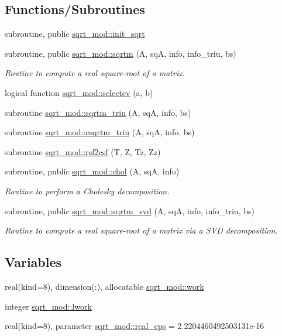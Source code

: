 \subsection*{Functions/\+Subroutines}
\begin{DoxyCompactItemize}
\item 
subroutine, public \hyperlink{namespacesqrt__mod_ab0108c0f48903dcc961e731c0ccb55d8}{sqrt\+\_\+mod\+::init\+\_\+sqrt}
\item 
subroutine, public \hyperlink{namespacesqrt__mod_a6da01b705b42190ac5b629e9267b0506}{sqrt\+\_\+mod\+::sqrtm} (A, sqA, info, info\+\_\+triu, bs)
\begin{DoxyCompactList}\small\item\em Routine to compute a real square-\/root of a matrix. \end{DoxyCompactList}\item 
logical function \hyperlink{namespacesqrt__mod_a8789d2f86087703a058918101999894f}{sqrt\+\_\+mod\+::selectev} (a, b)
\item 
subroutine \hyperlink{namespacesqrt__mod_a0bce77dc166341fedad843599efd43c7}{sqrt\+\_\+mod\+::sqrtm\+\_\+triu} (A, sqA, info, bs)
\item 
subroutine \hyperlink{namespacesqrt__mod_a7ed927e15fad09a188abebe860651125}{sqrt\+\_\+mod\+::csqrtm\+\_\+triu} (A, sqA, info, bs)
\item 
subroutine \hyperlink{namespacesqrt__mod_a322dc68a48c31785fb167134331e21e3}{sqrt\+\_\+mod\+::rsf2csf} (T, Z, Tz, Zz)
\item 
subroutine, public \hyperlink{namespacesqrt__mod_a6dd33ec6afedb4b752026bba20204f2c}{sqrt\+\_\+mod\+::chol} (A, sqA, info)
\begin{DoxyCompactList}\small\item\em Routine to perform a Cholesky decomposition. \end{DoxyCompactList}\item 
subroutine, public \hyperlink{namespacesqrt__mod_a99d44e5fd3e8203544db6a8331e38828}{sqrt\+\_\+mod\+::sqrtm\+\_\+svd} (A, sqA, info, info\+\_\+triu, bs)
\begin{DoxyCompactList}\small\item\em Routine to compute a real square-\/root of a matrix via a S\+VD decomposition. \end{DoxyCompactList}\end{DoxyCompactItemize}
\subsection*{Variables}
\begin{DoxyCompactItemize}
\item 
real(kind=8), dimension(\+:), allocatable \hyperlink{namespacesqrt__mod_aa2d42644fd62e62db048520605cd3de8}{sqrt\+\_\+mod\+::work}
\item 
integer \hyperlink{namespacesqrt__mod_a1e8a5c8ae6e96f5f02221379e30c0115}{sqrt\+\_\+mod\+::lwork}
\item 
real(kind=8), parameter \hyperlink{namespacesqrt__mod_a3e5758c92ccdba50c78201262be093c7}{sqrt\+\_\+mod\+::real\+\_\+eps} = 2.\+2204460492503131e-\/16
\end{DoxyCompactItemize}
